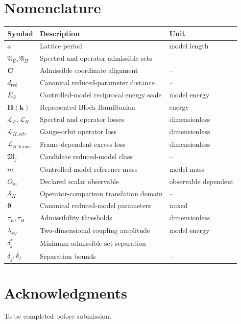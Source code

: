 \documentclass[preprint,12pt]{elsarticle}
\begin{document}
\section*{Nomenclature}
\begin{table}[ht]
\centering
\begin{tabular}{@{}lll@{}}
\toprule
Symbol & Description & Unit \\
\midrule
$a$ & Lattice period & model length \\
$\mathfrak{A}_E,\mathfrak{A}_H$ & Spectral and operator admissible sets & -- \\
$\bm{C}$ & Admissible coordinate alignment & -- \\
$d_{\mathrm{red}}$ & Canonical reduced-parameter distance & -- \\
$E_G$ & Controlled-model reciprocal energy scale & model energy \\
$\bm{H}(\bm{k})$ & Represented Bloch Hamiltonian & energy \\
$\mathcal{L}_E,\mathcal{L}_H$ & Spectral and operator losses & dimensionless \\
$\mathcal{L}_{H,\mathrm{orb}}$ & Gauge-orbit operator loss & dimensionless \\
$\mathcal{L}_{H,\mathrm{frame}}$ & Frame-dependent excess loss & dimensionless \\
$\mathfrak{M}_j$ & Candidate reduced-model class & -- \\
$m$ & Controlled-model reference mass & model mass \\
$O_m$ & Declared scalar observable & observable dependent \\
$\mathcal{S}_H$ & Operator-comparison translation domain & -- \\
$\bm{\theta}$ & Canonical reduced-model parameters & mixed \\
$\tau_E,\tau_H$ & Admissibility thresholds & dimensionless \\
$\lambda_{xy}$ & Two-dimensional coupling amplitude & model energy \\
$\delta_j^\ast$ & Minimum admissible-set separation & -- \\
$\underline{\delta}_j,\overline{\delta}_j$ & Separation bounds & -- \\
\bottomrule
\end{tabular}
\end{table}

\section*{Acknowledgments}
To be completed before submission.
\end{document}
